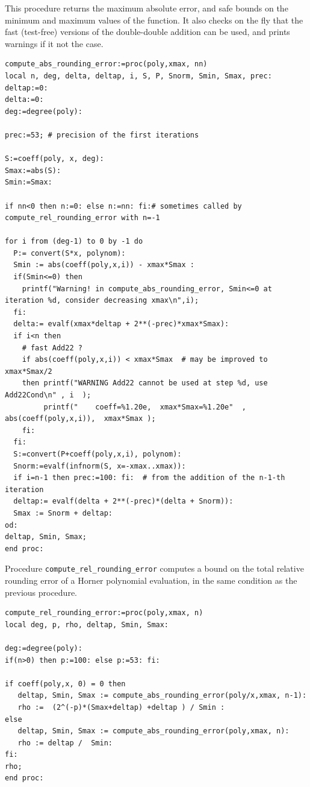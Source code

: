 This procedure returns the maximum absolute error, and safe bounds on the
minimum and maximum values of the function. It also checks on the fly
that the fast (test-free) versions of the double-double addition can
be used, and prints warnings if it not the case.

\begin{lstlisting}[caption={compute\_abs\_rounding\_error},firstnumber=1]
compute_abs_rounding_error:=proc(poly,xmax, nn)
local n, deg, delta, deltap, i, S, P, Snorm, Smin, Smax, prec:
deltap:=0:
delta:=0:
deg:=degree(poly):

prec:=53; # precision of the first iterations

S:=coeff(poly, x, deg):
Smax:=abs(S):
Smin:=Smax:

if nn<0 then n:=0: else n:=nn: fi:# sometimes called by compute_rel_rounding_error with n=-1

for i from (deg-1) to 0 by -1 do
  P:= convert(S*x, polynom):
  Smin := abs(coeff(poly,x,i)) - xmax*Smax : 
  if(Smin<=0) then 
    printf("Warning! in compute_abs_rounding_error, Smin<=0 at iteration %d, consider decreasing xmax\n",i);
  fi:
  delta:= evalf(xmax*deltap + 2**(-prec)*xmax*Smax):
  if i<n then 
    # fast Add22 ?    
    if abs(coeff(poly,x,i)) < xmax*Smax  # may be improved to xmax*Smax/2
    then printf("WARNING Add22 cannot be used at step %d, use Add22Cond\n" , i  );   
         printf("    coeff=%1.20e,  xmax*Smax=%1.20e"  ,  abs(coeff(poly,x,i)),  xmax*Smax );
    fi:
  fi:
  S:=convert(P+coeff(poly,x,i), polynom):
  Snorm:=evalf(infnorm(S, x=-xmax..xmax)):
  if i=n-1 then prec:=100: fi:  # from the addition of the n-1-th iteration
  deltap:= evalf(delta + 2**(-prec)*(delta + Snorm)): 
  Smax := Snorm + deltap:  
od:
deltap, Smin, Smax;
end proc:
\end{lstlisting}
\vspace{0.5cm}

Procedure \texttt{compute\_rel\_rounding\_error} computes a bound on
the total relative rounding error of a Horner polynomial evaluation,
in the same condition as the previous procedure.

\begin{lstlisting}[caption={compute\_abs\_rounding\_error},firstnumber=1]
compute_rel_rounding_error:=proc(poly,xmax, n)
local deg, p, rho, deltap, Smin, Smax:

deg:=degree(poly):
if(n>0) then p:=100: else p:=53: fi: 

if coeff(poly,x, 0) = 0 then
   deltap, Smin, Smax := compute_abs_rounding_error(poly/x,xmax, n-1):
   rho :=  (2^(-p)*(Smax+deltap) +deltap ) / Smin :
else
   deltap, Smin, Smax := compute_abs_rounding_error(poly,xmax, n):
   rho := deltap /  Smin:
fi:
rho;
end proc:
\end{lstlisting}
\vspace{0.5cm}

